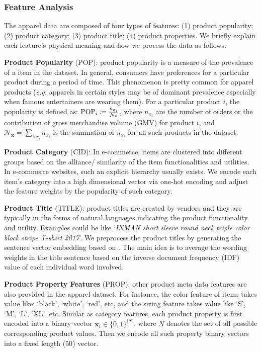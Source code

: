 \subsubsection{Feature Analysis}
The apparel data are composed of four types of features: (1) product popularity; (2) product category; (3) product title; (4) product properties.  We briefly explain each feature's physical meaning and how we process the data as follows:

\textbf{Product Popularity} (POP): product popularity is a measure of the prevalence of a item in the dataset. In general, consumers have preferences for a particular product during a period of time. This phenomenon is pretty common for apparel products (\emph{e.g.} apparels in certain styles may be of dominant prevalence especially when famous entertainers are wearing them). For a particular product $i$, the popularity is defined as: $\mathrm{\scriptsize POP}_{i} \coloneqq \frac{n_{x_i}}{\mathcal{N}_\mathbf{x}}$, where $n_{x_i}$ are the number of orders or the contribution of gross merchandise volume (GMV) for product $i$,  and $\mathcal{N}_\mathbf{x} = \sum_{\forall x_i}n_{x_i}$ is the summation of $n_{x_i}$ for all such products in the dataset. \newline

\textbf{Product Category} (CID): In e-commerce, items are clustered into different groups based on the alliance/ similarity of the item functionalities and utilities.  In e-commerce websites, such an explicit hierarchy usually exists.  We encode each item's category into a high dimensional vector via one-hot encoding and adjust the feature weights by the popularity of such category. \newline

\textbf{Product Title} (TITLE): product titles are created by vendors and they are typically in the forms of natural languages indicating the product functionality and utility.  Examples could be like `\emph{INMAN short sleeve round neck triple color block stripe T-shirt 2017}'.  We preprocess the product titles by generating the sentence vector embedding based on \cite{de2016representation}.  The main idea is to average the wording weights in the title sentence based on the inverse document frequency (IDF) value of each individual word involved. \newline

\textbf{Product Property Features} (PROP): other product meta data features are also provided in the apparel dataset. For instance, the color feature of items takes value like: `black', `white', `red', etc, and the sizing feature takes value like `S', `M', `L', `XL', etc.  Similar as category features, each product property is first encoded into a binary vector $\bm{x}_i \in \{0, 1\}^{|N|}$, where $N$ denotes the set of all possible corresponding product values.  Then we encode all such property binary vectors into a fixed length ($50$) vector. \newline

